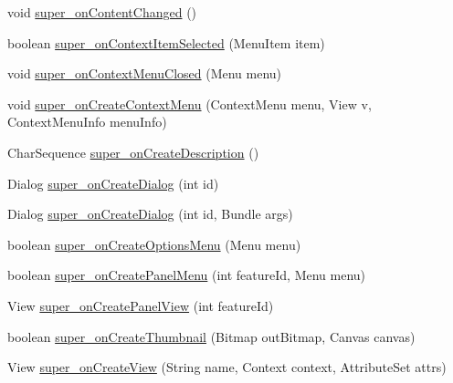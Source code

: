 \begin{DoxyCompactItemize}
\item 
void \hyperlink{classorg_1_1qtproject_1_1qt5_1_1android_1_1bindings_1_1_qt_activity_a65dc57b70d42eb56f6bc12f7e0c49022}{super\-\_\-on\-Content\-Changed} ()
\item 
boolean \hyperlink{classorg_1_1qtproject_1_1qt5_1_1android_1_1bindings_1_1_qt_activity_a7281a498436213e739110753b357c0bd}{super\-\_\-on\-Context\-Item\-Selected} (Menu\-Item item)
\item 
void \hyperlink{classorg_1_1qtproject_1_1qt5_1_1android_1_1bindings_1_1_qt_activity_a1b845060cb1ae8dde9bb8a60339b9468}{super\-\_\-on\-Context\-Menu\-Closed} (Menu menu)
\item 
void \hyperlink{classorg_1_1qtproject_1_1qt5_1_1android_1_1bindings_1_1_qt_activity_ae235bff28fac3ae862e49a1fc52caf15}{super\-\_\-on\-Create\-Context\-Menu} (Context\-Menu menu, View v, Context\-Menu\-Info menu\-Info)
\item 
Char\-Sequence \hyperlink{classorg_1_1qtproject_1_1qt5_1_1android_1_1bindings_1_1_qt_activity_a213a5e7065a1b53244d8b3642a23b2e4}{super\-\_\-on\-Create\-Description} ()
\item 
Dialog \hyperlink{classorg_1_1qtproject_1_1qt5_1_1android_1_1bindings_1_1_qt_activity_a946099e0315e24f0c40338b69e0d1cdf}{super\-\_\-on\-Create\-Dialog} (int id)
\item 
Dialog \hyperlink{classorg_1_1qtproject_1_1qt5_1_1android_1_1bindings_1_1_qt_activity_a814d7e98bb1c0355ed33457de6718bee}{super\-\_\-on\-Create\-Dialog} (int id, Bundle args)
\item 
boolean \hyperlink{classorg_1_1qtproject_1_1qt5_1_1android_1_1bindings_1_1_qt_activity_a25d0cb2383a485b28f53026ebe050dd4}{super\-\_\-on\-Create\-Options\-Menu} (Menu menu)
\item 
boolean \hyperlink{classorg_1_1qtproject_1_1qt5_1_1android_1_1bindings_1_1_qt_activity_a3d105b186ba9bf7d089699dbd5ca3c45}{super\-\_\-on\-Create\-Panel\-Menu} (int feature\-Id, Menu menu)
\item 
View \hyperlink{classorg_1_1qtproject_1_1qt5_1_1android_1_1bindings_1_1_qt_activity_ab37f48e1ce50767f29be1cebd4fc96e0}{super\-\_\-on\-Create\-Panel\-View} (int feature\-Id)
\item 
boolean \hyperlink{classorg_1_1qtproject_1_1qt5_1_1android_1_1bindings_1_1_qt_activity_a2af36b766142fa45fa77623e549112ac}{super\-\_\-on\-Create\-Thumbnail} (Bitmap out\-Bitmap, Canvas canvas)
\item 
View \hyperlink{classorg_1_1qtproject_1_1qt5_1_1android_1_1bindings_1_1_qt_activity_a4e054eb047b9531cc8abaa75039136f2}{super\-\_\-on\-Create\-View} (String name, Context context, Attribute\-Set attrs)

\end{DoxyCompactItemize}
